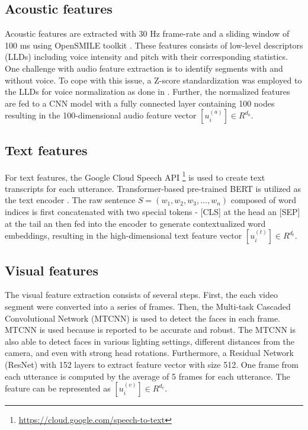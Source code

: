 \subsection{Acoustic features}
Acoustic features are extracted with 30 Hz frame-rate and a sliding window of 100 ms using OpenSMILE toolkit \cite{opensmile}. These features consists of low-level descriptors (LLDs) including voice intensity and pitch with their corresponding statistics. One challenge with audio feature extraction is to identify segments with and without voice. To cope with this issue, a Z-score standardization was employed to the LLDs for voice normalization as done in \cite{z-score-8215597}. Further, the normalized features are fed to a CNN model with a fully connected layer containing 100 nodes resulting in the 100-dimensional audio feature vector $[u_i^{(a)}]\in R^{d_{a}}$. 

\subsection{Text features}
For text features, the Google Cloud Speech API \footnote{\url{https://cloud.google.com/speech-to-text}} is used to create text transcripts for each utterance. Transformer-based pre-trained BERT is utilized as the text encoder \cite{BERT-reimers2019sentence}. The raw sentence $S = (w_{1}, w_{2}, w_{3}, ..., w_{n})$ composed of word indices is first concatenated with two special tokens - [CLS] at the head an [SEP] at the tail an then fed into the encoder to generate contextualized word embeddings,  resulting in the high-dimensional text feature vector $[u_i^{(t)}]\in R^{d_{t}}$. 

\subsection{Visual features}
The visual feature extraction consists of several steps. First, the each video segment were converted into a series of frames. Then, the Multi-task Cascaded Convolutional Network (MTCNN) \cite{MTCNN-9239720} is used to detect the faces in each frame. MTCNN is used because is reported to be accurate and robust. The MTCNN is also able to detect faces in various lighting settings, different distances from the camera, and even with strong head rotations. Furthermore, a Residual Network (ResNet) with 152 layers to extract feature vector with size 512. One frame from each utterance is computed by the average of 5 frames for each utterance. The feature can be represented as $[u_i^{(v)}]\in R^{d_{v}}$. \\

